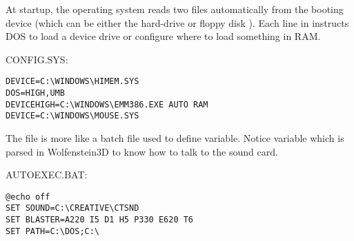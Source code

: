 \documentclass[book.tex]{subfiles}
\begin{document}
At startup, the operating system reads two files automatically from the booting device (which can be either the hard-drive  or floppy disk ). Each line 
in  instructs DOS to load a device drive or configure where to load something in RAM.\\ 
\par
CONFIG.SYS:\\
 \begin{lstlisting}[breaklines=true,breakindent=0em]
DEVICE=C:\WINDOWS\HIMEM.SYS
DOS=HIGH,UMB
DEVICEHIGH=C:\WINDOWS\EMM386.EXE AUTO RAM
DEVICE=C:\WINDOWS\MOUSE.SYS
\end{lstlisting}
\par
The file  is more like a batch file used to define variable. Notice  variable which is parsed in Wolfenstein3D to know how to talk to the sound card.\\
\par
AUTOEXEC.BAT:\\
 \begin{lstlisting}[breaklines=true,breakindent=0em]
@echo off
SET SOUND=C:\CREATIVE\CTSND
SET BLASTER=A220 I5 D1 H5 P330 E620 T6
SET PATH=C:\DOS;C:\ 
\end{lstlisting}
\end{document}
